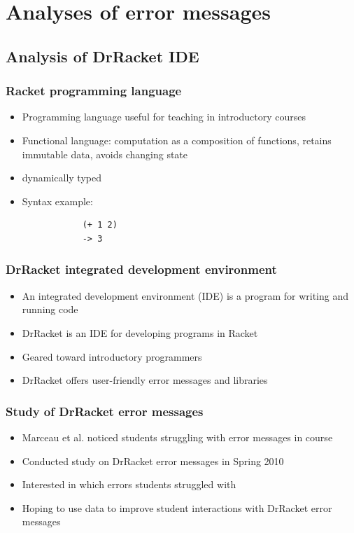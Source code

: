 \documentclass{beamer}
\begin{document}
\section[Analyses]{Analyses of error messages}

\subsection[DrRacket Analysis]{Analysis of DrRacket IDE}

\begin{frame}[fragile]
	\frametitle{Racket programming language}
		\begin{itemize}
			\item Programming language useful for teaching in introductory courses
			\item Functional language: computation as a composition of functions, retains immutable data, avoids changing state
			\item dynamically typed
			\item Syntax example:
			\begin{verbatim}
			(+ 1 2)
			-> 3
			\end{verbatim}
		\end{itemize}

\end{frame}

\begin{frame}
	\frametitle{DrRacket integrated development environment}
		\begin{itemize}
			\item An integrated development environment (IDE) is a program for writing and running code
			\item DrRacket is an IDE for developing programs in Racket
			\item Geared toward introductory programmers
			\item DrRacket offers user-friendly error messages and libraries
		\end{itemize}
		
\end{frame}



\begin{frame}
	\frametitle{Study of DrRacket error messages}
		\begin{itemize}
		  	\item Marceau et al. noticed students struggling with error messages in course
			\item Conducted study on DrRacket error messages in Spring 2010
			\item Interested in which errors students struggled with
			\item Hoping to use data to improve student interactions with DrRacket error messages

		\end{itemize}
\end{frame}
		
\end{document}
